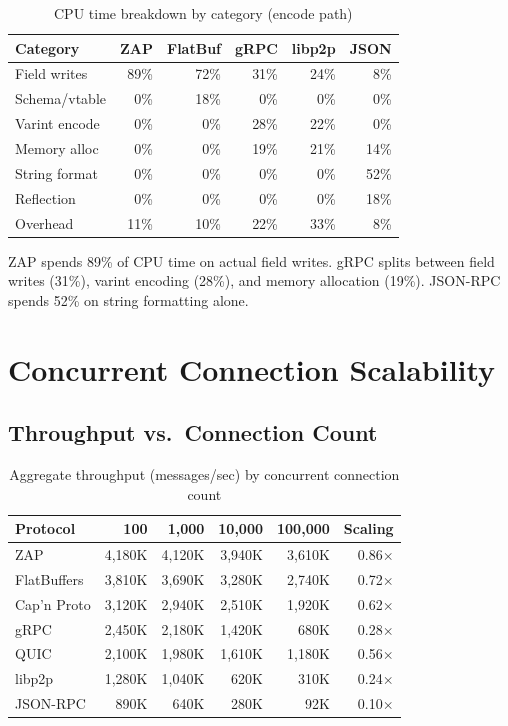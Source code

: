 \documentclass[11pt,letterpaper]{article}
\begin{document}
\begin{table}[h]
\centering
\caption{CPU time breakdown by category (encode path)}
\label{tab:cpuprofile}
\begin{tabular}{lrrrrr}
\toprule
\textbf{Category} & \textbf{ZAP} & \textbf{FlatBuf} & \textbf{gRPC} & \textbf{libp2p} & \textbf{JSON} \\
\midrule
Field writes & 89\% & 72\% & 31\% & 24\% & 8\% \\
Schema/vtable & 0\% & 18\% & 0\% & 0\% & 0\% \\
Varint encode & 0\% & 0\% & 28\% & 22\% & 0\% \\
Memory alloc & 0\% & 0\% & 19\% & 21\% & 14\% \\
String format & 0\% & 0\% & 0\% & 0\% & 52\% \\
Reflection & 0\% & 0\% & 0\% & 0\% & 18\% \\
Overhead & 11\% & 10\% & 22\% & 33\% & 8\% \\
\bottomrule
\end{tabular}
\end{table}

ZAP spends 89\% of CPU time on actual field writes. gRPC splits between field writes (31\%), varint encoding (28\%), and memory allocation (19\%). JSON-RPC spends 52\% on string formatting alone.

\section{Concurrent Connection Scalability}

\subsection{Throughput vs.\ Connection Count}

\begin{table}[h]
\centering
\caption{Aggregate throughput (messages/sec) by concurrent connection count}
\label{tab:conns}
\begin{tabular}{lrrrrr}
\toprule
\textbf{Protocol} & \textbf{100} & \textbf{1,000} & \textbf{10,000} & \textbf{100,000} & \textbf{Scaling} \\
\midrule
\rowcolor{luxblue!10}
ZAP & 4,180K & 4,120K & 3,940K & 3,610K & 0.86$\times$ \\
FlatBuffers & 3,810K & 3,690K & 3,280K & 2,740K & 0.72$\times$ \\
Cap'n Proto & 3,120K & 2,940K & 2,510K & 1,920K & 0.62$\times$ \\
gRPC & 2,450K & 2,180K & 1,420K & 680K & 0.28$\times$ \\
QUIC & 2,100K & 1,980K & 1,610K & 1,180K & 0.56$\times$ \\
libp2p & 1,280K & 1,040K & 620K & 310K & 0.24$\times$ \\
JSON-RPC & 890K & 640K & 280K & 92K & 0.10$\times$ \\
\bottomrule
\end{tabular}
\end{table}
\end{document}
